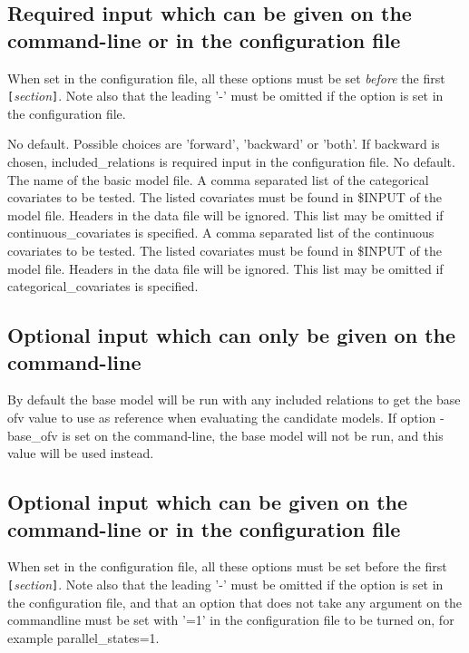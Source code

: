 \subsection{Required input which can be given on the command-line or in the configuration file}
When set in the configuration file, all these options must be set \emph{before} the 
first \verb|[|\emph{section}\verb|]|. Note also that the leading '-' must be omitted if the option is set
in the configuration file.

\begin{optionlist}
No default. Possible choices are 'forward', 'backward' or 'both'. If backward is chosen, included\_relations is required input in the configuration file. 
\nextopt
{}
No default. The name of the basic model file. 
\nextopt
{}
A comma separated list of the categorical covariates to be tested. The listed covariates must be found in \$INPUT of the model file. Headers in the data file will be ignored. This list may be omitted if continuous\_covariates is specified. 
\nextopt
{}
A comma separated list of the continuous covariates to be tested. The listed covariates must be found in \$INPUT of the model file. Headers in the data file will be ignored. This list may be omitted if categorical\_covariates is specified. 
\nextopt
\end{optionlist}

\subsection{Optional input which can only be given on the command-line}
\begin{optionlist}
By default the base model will be run with any included relations
to get the base ofv value to use as reference when evaluating the candidate models.
If option -base\_ofv is set on the command-line, the base model will not be run,
and this value will be used instead.
\nextopt
\end{optionlist}

\subsection{Optional input which can be given on the command-line or in the configuration file}
When set in the configuration file, all these options must be set before the first 
\verb|[|\emph{section}\verb|]|. Note also that the leading '-' must be omitted if the option is set
in the configuration file, and that an option that does not take any argument on the commandline must be
set with '=1' in the configuration file to be turned on, for example parallel\_states=1.

